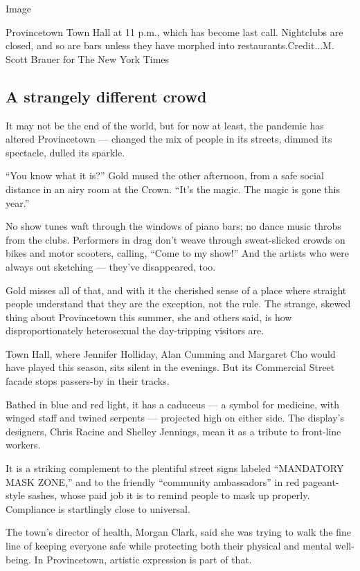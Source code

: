 Image

Provincetown Town Hall at 11 p.m., which has become last call.
Nightclubs are closed, and so are bars unless they have morphed into
restaurants.Credit...M. Scott Brauer for The New York Times

\hypertarget{a-strangely-different-crowd}{%
\subsection{A strangely different
crowd}\label{a-strangely-different-crowd}}

It may not be the end of the world, but for now at least, the pandemic
has altered Provincetown --- changed the mix of people in its streets,
dimmed its spectacle, dulled its sparkle.

``You know what it is?'' Gold mused the other afternoon, from a safe
social distance in an airy room at the Crown. ``It's the magic. The
magic is gone this year.''

No show tunes waft through the windows of piano bars; no dance music
throbs from the clubs. Performers in drag don't weave through
sweat-slicked crowds on bikes and motor scooters, calling, ``Come to my
show!'' And the artists who were always out sketching --- they've
disappeared, too.

Gold misses all of that, and with it the cherished sense of a place
where straight people understand that they are the exception, not the
rule. The strange, skewed thing about Provincetown this summer, she and
others said, is how disproportionately heterosexual the day-tripping
visitors are.

Town Hall, where Jennifer Holliday, Alan Cumming and Margaret Cho would
have played this season, sits silent in the evenings. But its Commercial
Street facade stops passers-by in their tracks.

Bathed in blue and red light, it has a caduceus --- a symbol for
medicine, with winged staff and twined serpents --- projected high on
either side. The display's designers, Chris Racine and Shelley Jennings,
mean it as a tribute to front-line workers.

It is a striking complement to the plentiful street signs labeled
``MANDATORY MASK ZONE,'' and to the friendly ``community ambassadors''
in red pageant-style sashes, whose paid job it is to remind people to
mask up properly. Compliance is startlingly close to universal.

The town's director of health, Morgan Clark, said she was trying to walk
the fine line of keeping everyone safe while protecting both their
physical and mental well-being. In Provincetown, artistic expression is
part of that.

